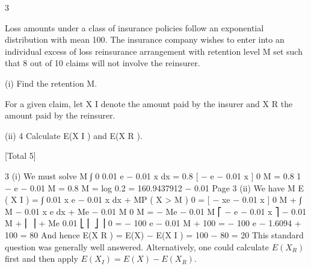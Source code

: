 \documentclass[a4paper,12pt]{article}
\begin{document}
3

Loss amounts under a class of insurance policies follow an exponential distribution
with mean 100. The insurance company wishes to enter into an individual excess of
loss reinsurance arrangement with retention level M set such that 8 out of 10 claims
will not involve the reinsurer.
\item (i)
Find the retention M.

For a given claim, let X I denote the amount paid by the insurer and X R the amount
paid by the reinsurer.
\item (ii)
4
Calculate E(X I ) and E(X R ).

[Total 5]



3
(i)
We must solve
M
∫ 0
0.01 e − 0.01 x dx = 0.8
[ − e − 0.01 x ] 0 M = 0.8
1 − e − 0.01 M = 0.8
M =
log 0.2
= 160.9437912
− 0.01
Page 3%
(ii)
We have
M
E ( X I ) = ∫ 0.01 x e − 0.01 x dx + MP ( X > M )
0
= [ − xe − 0.01 x ] 0 M + ∫
M − 0.01 x
e
dx + Me − 0.01 M
0
M
= − Me
− 0.01 M
⎡ − e − 0.01 x ⎤
− 0.01 M
+ ⎢
⎥ + Me
0.01
⎣ ⎢
⎦ ⎥ 0
= − 100 e − 0.01 M + 100
= − 100 e − 1.6094 + 100 = 80
And hence E(X R ) = E(X) − E(X I ) = 100 − 80 = 20
This standard question was generally well answered. Alternatively, one could calculate
$E(X_R )$ first and then apply $E(X_I ) = E(X) − E(X_R )$.
\end{document}
